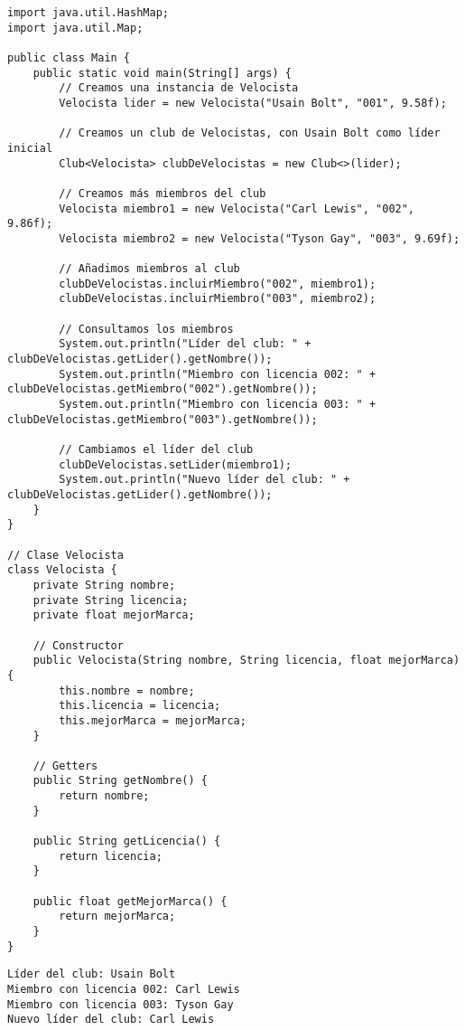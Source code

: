 \documentclass[a4paper,12pt]{article}
\begin{document}
\begin{lstlisting}[style=customcpp, caption={Main}]
import java.util.HashMap;
import java.util.Map;

public class Main {
    public static void main(String[] args) {
        // Creamos una instancia de Velocista
        Velocista lider = new Velocista("Usain Bolt", "001", 9.58f);

        // Creamos un club de Velocistas, con Usain Bolt como líder inicial
        Club<Velocista> clubDeVelocistas = new Club<>(lider);

        // Creamos más miembros del club
        Velocista miembro1 = new Velocista("Carl Lewis", "002", 9.86f);
        Velocista miembro2 = new Velocista("Tyson Gay", "003", 9.69f);

        // Añadimos miembros al club
        clubDeVelocistas.incluirMiembro("002", miembro1);
        clubDeVelocistas.incluirMiembro("003", miembro2);

        // Consultamos los miembros
        System.out.println("Líder del club: " + clubDeVelocistas.getLider().getNombre());
        System.out.println("Miembro con licencia 002: " + clubDeVelocistas.getMiembro("002").getNombre());
        System.out.println("Miembro con licencia 003: " + clubDeVelocistas.getMiembro("003").getNombre());

        // Cambiamos el líder del club
        clubDeVelocistas.setLider(miembro1);
        System.out.println("Nuevo líder del club: " + clubDeVelocistas.getLider().getNombre());
    }
}

// Clase Velocista
class Velocista {
    private String nombre;
    private String licencia;
    private float mejorMarca;

    // Constructor
    public Velocista(String nombre, String licencia, float mejorMarca) {
        this.nombre = nombre;
        this.licencia = licencia;
        this.mejorMarca = mejorMarca;
    }

    // Getters
    public String getNombre() {
        return nombre;
    }

    public String getLicencia() {
        return licencia;
    }

    public float getMejorMarca() {
        return mejorMarca;
    }
}

\end{lstlisting}

\begin{lstlisting}[caption = {Salida del Main}]
Líder del club: Usain Bolt
Miembro con licencia 002: Carl Lewis
Miembro con licencia 003: Tyson Gay
Nuevo líder del club: Carl Lewis

\end{lstlisting}
\end{document}
